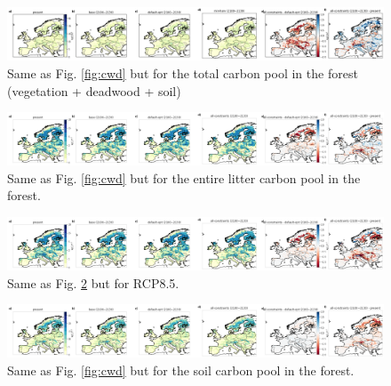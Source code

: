 \documentclass[]{article}
\begin{document}
\begin{figure}[h!]
	\centering		\includegraphics[width=\linewidth]{supplement_figs/cpool_provision_sum_default_maintain_harv45.png}
	\caption{Same as Fig. \ref{fig:cwd} but for the total carbon pool in the forest (vegetation + deadwood + soil)}
	\label{fig:cpool}
\end{figure}





\begin{figure}[h!]
	\centering		\includegraphics[width=\linewidth]{supplement_figs/cpool_provision_sum_default_all_litter45.png}
	\caption{Same as Fig. \ref{fig:cwd} but for the entire litter carbon pool in the forest.}
	\label{fig:litter45}
\end{figure}


\begin{figure}[h!]
	\centering		\includegraphics[width=\linewidth]{supplement_figs/cpool_provision_sum_default_all_litter85.png}
	\caption{Same as Fig. \ref{fig:litter45} but for RCP8.5.}
	\label{fig:litter85}
\end{figure}


\begin{figure}[h!]
	\centering		\includegraphics[width=\linewidth]{supplement_figs/cpool_provision_sum_default_all_soil45.png}
	\caption{Same as Fig. \ref{fig:cwd} but for the soil carbon pool in the forest.}
	\label{fig:soil45}
\end{figure}
\end{document}
